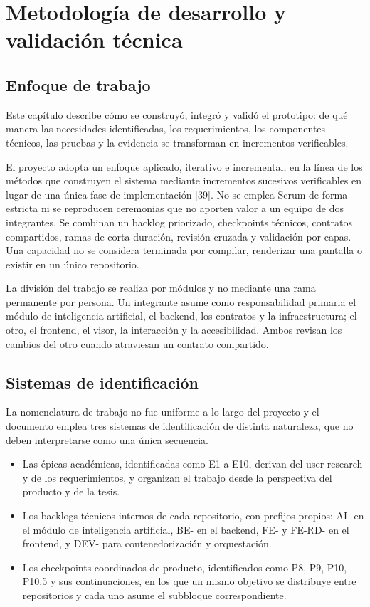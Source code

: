 \chapter{Metodología de desarrollo y validación técnica}
\label{chap:metodologia-validacion}

\section{Enfoque de trabajo}

Este capítulo describe cómo se construyó, integró y validó el prototipo: de qué manera las necesidades identificadas, los requerimientos, los componentes técnicos, las pruebas y la evidencia se transforman en incrementos verificables.

El proyecto adopta un enfoque aplicado, iterativo e incremental, en la línea de los métodos que construyen el sistema mediante incrementos sucesivos verificables en lugar de una única fase de implementación [39]. No se emplea Scrum de forma estricta ni se reproducen ceremonias que no aporten valor a un equipo de dos integrantes. Se combinan un backlog priorizado, checkpoints técnicos, contratos compartidos, ramas de corta duración, revisión cruzada y validación por capas. Una capacidad no se considera terminada por compilar, renderizar una pantalla o existir en un único repositorio.

La división del trabajo se realiza por módulos y no mediante una rama permanente por persona. Un integrante asume como responsabilidad primaria el módulo de inteligencia artificial, el backend, los contratos y la infraestructura; el otro, el frontend, el visor, la interacción y la accesibilidad. Ambos revisan los cambios del otro cuando atraviesan un contrato compartido.

\section{Sistemas de identificación}

La nomenclatura de trabajo no fue uniforme a lo largo del proyecto y el documento emplea tres sistemas de identificación de distinta naturaleza, que no deben interpretarse como una única secuencia.

\begin{itemize}
\item Las épicas académicas, identificadas como E1 a E10, derivan del user research y de los requerimientos, y organizan el trabajo desde la perspectiva del producto y de la tesis.
\item Los backlogs técnicos internos de cada repositorio, con prefijos propios: AI- en el módulo de inteligencia artificial, BE- en el backend, FE- y FE-RD- en el frontend, y DEV- para contenedorización y orquestación.
\item Los checkpoints coordinados de producto, identificados como P8, P9, P10, P10.5 y sus continuaciones, en los que un mismo objetivo se distribuye entre repositorios y cada uno asume el subbloque correspondiente.
\end{itemize}


